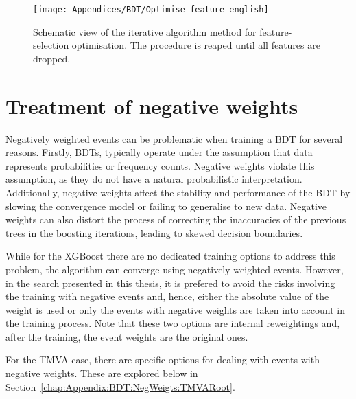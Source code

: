 \begin{figure}[h]
\centering
  \centering
  \texttt{[image: Appendices/BDT/Optimise\_feature\_english]}
\caption{Schematic view of the iterative algorithm method for feature-selection optimisation. The procedure is 
reaped until all features are dropped.}
\label{fig:Appendix:BDT:Feature_loop}
\end{figure}


\section{Treatment of negative weights}
\label{chap:Appendix:BDT:NegWeigts}
Negatively weighted events can be problematic when training a BDT
for several reasons.
Firstly, BDTs, typically operate under the assumption that data represents probabilities or 
frequency counts. Negative weights violate this assumption, as they do not have a natural 
probabilistic interpretation.
Additionally, negative weights affect the stability and performance of the BDT by 
slowing the convergence model or failing to generalise to new data. 
Negative weights can also distort the process of  correcting the inaccuracies of
the previous trees in the boosting iterations, leading to skewed decision boundaries. 

While for the XGBoost there are no dedicated training options to address this problem,
the algorithm can converge using negatively-weighted events. However, in the
search presented in this thesis, it is prefered to avoid the risks involving the training with
negative events and, hence, either the absolute value of the weight is used
or only the events with negative weights are taken into account in the training
process. Note that these two options are internal reweightings and, after the
training, the event weights are the original ones. %


For the TMVA case, there are specific options for dealing with events with negative
weights. These are explored below in Section~\ref{chap:Appendix:BDT:NegWeigts:TMVARoot}.


